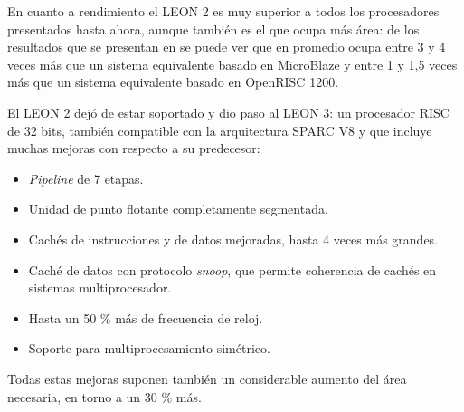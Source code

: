En cuanto a rendimiento el LEON 2 es muy superior a todos los procesadores presentados hasta ahora, aunque también es el que ocupa más área: de los resultados que se presentan en \cite{Etiqueta32} se puede ver que en promedio ocupa entre 3 y 4 veces más que un sistema equivalente basado en MicroBlaze y entre 1 y 1,5 veces más que un sistema equivalente basado en OpenRISC 1200. 

El LEON 2 dejó de estar soportado y dio paso al LEON 3: un procesador RISC de 32 bits, también compatible con la arquitectura SPARC V8 y que incluye muchas mejoras con respecto a su predecesor:

\begin{itemize}
		 
	       \item \textit{Pipeline} de 7 etapas.
		 \item Unidad de punto flotante completamente segmentada.
		 \item Cachés de instrucciones y de datos mejoradas, hasta 4 veces más grandes.
 		\item  Caché de datos con protocolo \textit{snoop}, que permite coherencia de cachés en sistemas multiprocesador.
		\item Hasta un 50 \% más de frecuencia de reloj.
		\item Soporte para multiprocesamiento simétrico.
		\end{itemize}
   
Todas estas mejoras suponen también un considerable aumento del área necesaria, en torno a un 30 \% más.

